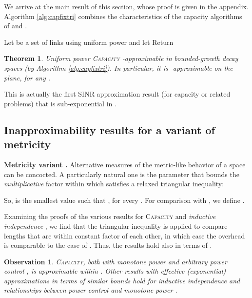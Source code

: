 \documentclass[11pt]{amsart}
\newcounter{foo}
\newtheorem{theorem}[foo]{Theorem}
\newtheorem{observation}[lemma]{Observation}
\newcommand{\prob}[1]{\textsc{#1}}
\newcommand{\Capacity}{\prob{Capacity}}
\newcommand{\capacity}{\Capacity}
\newcommand{\mypara}[1]{\smallskip\noindent\textbf{#1.}}  \newcommand{\tightpara}[1]{\noindent\textbf{#1.}}  \newcommand{\inddim}{D}
\begin{document}
We arrive at the main result of this section, whose proof is given in the appendix. Algorithm \ref{alg:capfixtri} combines the characteristics of the capacity algorithms of \cite{GHWW09} and \cite{SODA11}.


\begin{algorithm}[h]
\caption{Capacity for uniform power in bounded-growth decay spaces.}\label{alg:capfixtri}
\begin{algorithmic}
\STATE Let  be a set of links using uniform power and let 
 \label{alg:tri1/2}
\STATE 
\ENDIF
\ENDFOR
\STATE Return 
\end{algorithmic}
\end{algorithm}

\begin{theorem}
  Uniform power {\capacity} -approximable in
  bounded-growth decay spaces (by Algorithm \ref{alg:capfixtri}).
  In particular, it is -approximable on the plane, for any .
\label{thm:cap-poly-bndgwth}
\end{theorem}

This is actually the first SINR approximation result (for capacity or related problems) that is sub-exponential in .

\subsection{Inapproximability results for a variant of metricity}
\label{sec:expon-phi}

\mypara{Metricity variant  } 
Alternative measures of the metric-like behavior of a space
 can
be concocted. A particularly natural one is the 
parameter  that bounds the \emph{multiplicative} factor within which 
 satisfies a relaxed triangular inequality:

So,  is the smallest value such that , for every .
For comparison with , we define .

Examining the proofs of the various results for {\capacity} 
and \emph{inductive independence} \cite{hoeferspaa}, we find that the triangular
inequality is applied to compare lengths that are within constant
factor of each other, in which case the overhead is comparable to the case of . Thus, the results hold also in terms of .

\begin{observation} {\capacity}, both with monotone power
  \cite{SODA11,us:ICDCS14} and arbitrary power control
  \cite{KesselheimSODA11}, is approximable within .
  Other results with effective (exponential) approximations in terms
  of similar bounds hold for inductive independence
  \cite{hoeferspaa,us:SODA13} and relationships between power control
  and monotone power \cite{us:SODA13}.
\end{observation}
\end{document}
